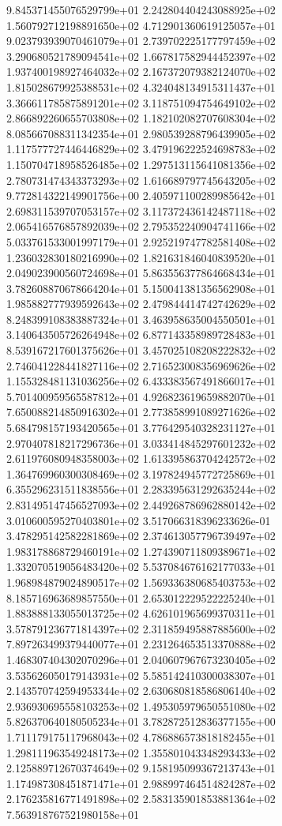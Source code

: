 9.845371455076529799e+01 2.242804404243088925e+02 1.560792712198891650e+02
4.712901360619125057e+01 9.023793939070461079e+01 2.739702225177797459e+02
3.290680521789094541e+02 1.667817582944452397e+02 1.937400198927464032e+02
2.167372079382124070e+02 1.815028679925388531e+02 4.324048134915311437e+01
3.366611785875891201e+02 3.118751094754649102e+02 2.866892260655703808e+02
1.182102082707608304e+02 8.085667088311342354e+01 2.980539288796439905e+02
1.117577727446446829e+02 3.479196222524698783e+02 1.150704718958526485e+02
1.297513115641081356e+02 2.780731474343373293e+02 1.616689797745643205e+02
9.772814322149901756e+00 2.405971100289985642e+01 2.698311539707053157e+02
3.117372436142487118e+02 2.065416576857892039e+02 2.795352240904741166e+02
5.033761533001997179e+01 2.925219747782581408e+02 1.236032830180216990e+02
1.821631846040839520e+01 2.049023900560724698e+01 5.863556377864668434e+01
3.782608870678664204e+01 5.150041381356562908e+01 1.985882777939592643e+02
2.479844414742742629e+02 8.248399108383887324e+01 3.463958635004550501e+01
3.140643505726264948e+02 6.877143358989728483e+01 8.539167217601375626e+01
3.457025108208222832e+02 2.746041228441827116e+02 2.716523008356969626e+02
1.155328481131036256e+02 6.433383567491866017e+01 5.701400959565587812e+01
4.926823619659882070e+01 7.650088214850916302e+01 2.773858991089271626e+02
5.684798157193420565e+01 3.776429540328231127e+01 2.970407818217296736e+01
3.033414845297601232e+02 2.611976080948358003e+02 1.613395863704242572e+02
1.364769960300308469e+02 3.197824945772725869e+01 6.355296231511838556e+01
2.283395631292635244e+02 2.831495147456527093e+02 2.449268786962880142e+02
3.010600595270403801e+02 3.517066318396233626e-01 3.478295142582281869e+02
2.374613057796739497e+02 1.983178868729460191e+02 1.274390711809389671e+02
1.332070519056483420e+02 5.537084676162177033e+01 1.968984879024890517e+02
1.569336380685403753e+02 8.185716963689857550e+01 2.653012229522225240e+01
1.883888133055013725e+02 4.626101965699370311e+01 3.578791236771814397e+02
2.311859495887885600e+02 7.897263499379440077e+01 2.231264653513370888e+02
1.468307404302070296e+01 2.040607967673230405e+02 3.535626050179143931e+02
5.585142410300038307e+01 2.143570742594953344e+02 2.630680818586806140e+02
2.936930695558103253e+02 1.495305979650551080e+02 5.826370640180505234e+01
3.782872512836377155e+00 1.711179175117968043e+02 4.786886573818182455e+01
1.298111963549248173e+02 1.355801043348293433e+02 2.125889712670374649e+02
9.158195099367213743e+01 1.174987308451871471e+01 2.988997464514824287e+02
2.176235816771491898e+02 2.583135901853881364e+02 7.563918767521980158e+01
